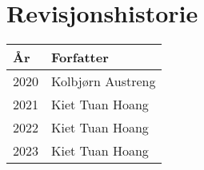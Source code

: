 
\section*{Revisjonshistorie}
\begin{center}
 \begin{tabular}{|p{1.5cm} p{5.5cm}|} 
 \hline
 År & Forfatter \\ [0.5ex] 
 \hline\hline
 2020 & Kolbjørn Austreng  \\ 
 \hline
 2021 & Kiet Tuan Hoang \\
 \hline
  2022 & Kiet Tuan Hoang \\
 \hline
   2023 & Kiet Tuan Hoang \\
 \hline
\end{tabular}
\end{center}


